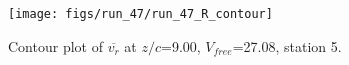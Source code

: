 \begin{figure}[H]
\centering
\texttt{[image: figs/run\_47/run\_47\_R\_contour]}
\caption{Contour plot of $\overline{v_{r}}$ at $z/c$=9.00, $V_{free}$=27.08, station 5.}
\label{fig:run_47_R_contour}
\end{figure}


